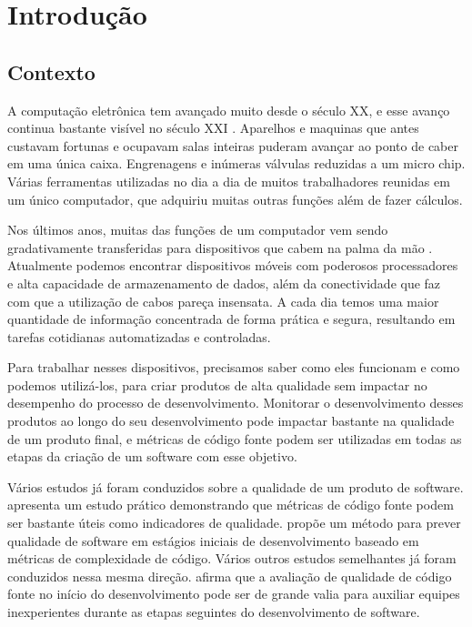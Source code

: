 \chapter{Introdução}
\section{Contexto}

A computação eletrônica tem avançado muito desde o século XX, e esse avanço continua bastante visível no século XXI \cite{histcomputacao2007}. Aparelhos e maquinas que antes custavam fortunas e ocupavam salas inteiras puderam avançar ao ponto de caber em uma única caixa. Engrenagens e inúmeras válvulas reduzidas a um micro chip. Várias ferramentas utilizadas no dia a dia de muitos trabalhadores reunidas em um único computador, que adquiriu muitas outras funções além de fazer cálculos.

Nos últimos anos, muitas das funções de um computador vem sendo gradativamente transferidas para dispositivos que cabem na palma da mão \cite{mobilemassmedia}. Atualmente podemos encontrar dispositivos móveis com poderosos processadores e alta capacidade de armazenamento de dados, além da conectividade que faz com que a utilização de cabos pareça insensata. A cada dia temos uma maior quantidade de informação concentrada de forma prática e segura, resultando em tarefas cotidianas automatizadas e controladas.

Para trabalhar nesses dispositivos, precisamos saber como eles funcionam e como podemos utilizá-los, para criar produtos de alta qualidade sem impactar no desempenho do processo de desenvolvimento. Monitorar o desenvolvimento desses produtos ao longo do seu desenvolvimento pode impactar bastante na qualidade de um produto final, e métricas de código fonte podem ser utilizadas em todas as etapas da criação de um software com esse objetivo. 

Vários estudos já foram conduzidos sobre a qualidade de um produto de software.  apresenta um estudo prático demonstrando que métricas de código fonte podem ser bastante úteis como indicadores de qualidade.  propõe um método para prever qualidade de software em estágios iniciais de desenvolvimento baseado em métricas de complexidade de código. Vários outros estudos semelhantes já foram conduzidos nessa mesma direção.  afirma que a avaliação de qualidade de código fonte no início do desenvolvimento pode ser de grande valia para auxiliar equipes inexperientes durante as etapas seguintes do desenvolvimento de software.

